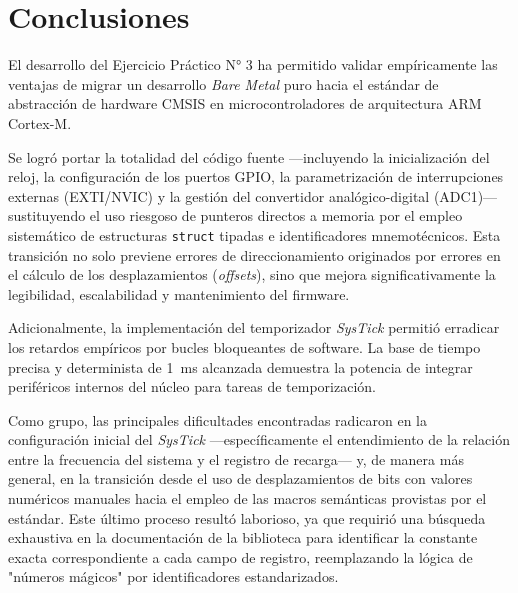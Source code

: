 \chapter{Conclusiones}
\label{ch:conclusiones}

El desarrollo del Ejercicio Práctico N° 3 ha permitido validar empíricamente las ventajas de migrar
un desarrollo \textit{Bare Metal} puro hacia el estándar de abstracción de hardware CMSIS en microcontroladores
de arquitectura ARM Cortex-M.

Se logró portar la totalidad del código fuente —incluyendo la inicialización del reloj, la configuración
de los puertos GPIO, la parametrización de interrupciones externas (EXTI/NVIC) y la gestión del
convertidor analógico-digital (ADC1)— sustituyendo el uso riesgoso de punteros directos a memoria
por el empleo sistemático de estructuras \lstinline{struct} tipadas e identificadores mnemotécnicos. 
Esta transición no solo previene errores de direccionamiento originados por errores en el cálculo
de los desplazamientos (\textit{offsets}), sino que mejora significativamente la legibilidad, escalabilidad
y mantenimiento del firmware.

Adicionalmente, la implementación del temporizador \textit{SysTick} permitió erradicar los retardos
empíricos por bucles bloqueantes de software. La base de tiempo precisa y determinista de \qty{1}{\ms}
alcanzada demuestra la potencia de integrar periféricos internos del núcleo para tareas de temporización.

Como grupo, las principales dificultades encontradas radicaron en la configuración inicial del \textit{SysTick}
—específicamente el entendimiento de la relación entre la frecuencia del sistema y el registro de recarga— y, de manera
más general, en la transición desde el uso de desplazamientos de bits con valores numéricos manuales hacia el empleo de
las macros semánticas provistas por el estándar. Este último proceso resultó laborioso, ya que requirió una búsqueda
exhaustiva en la documentación de la biblioteca para identificar la constante exacta correspondiente a cada campo de
registro, reemplazando la lógica de "números mágicos" por identificadores estandarizados. 
